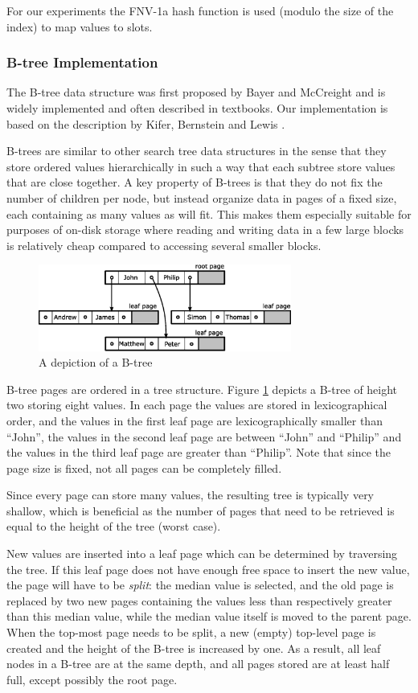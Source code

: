 \documentclass{acm_proc_article-sp}
\begin{document}
For our
experiments the FNV-1a hash function \cite{noll2004fnv} is used (modulo the
size of the index) to map values to slots.

\subsubsection{B-tree Implementation}
The B-tree data structure was first proposed by Bayer and McCreight
\cite{bayer1970oam} and is widely implemented and often described in
textbooks. Our implementation is based on the description by Kifer, Bernstein
and Lewis \cite{kifer2006dsa}.

B-trees are similar to other search tree data structures in the sense that
they store ordered values hierarchically in such a way that each subtree store
values that are close together.
A key property of B-trees is that they do not fix the number of children per
node, but instead organize data in pages of a fixed size, each containing
as many values as will fit. This makes them especially suitable for purposes
of on-disk storage where reading and writing data in a few large blocks is
relatively cheap compared to accessing several smaller blocks.

\begin{figure}
\centering
\includegraphics[width=83mm]{b-tree}
\caption{A depiction of a B-tree}
\label{fig-b-tree}
\end{figure}

B-tree pages are ordered in a tree structure. Figure \ref{fig-b-tree} depicts a
B-tree of height two storing eight values.
In each page the values are stored in lexicographical order, and the values
in the first leaf page are lexicographically smaller than ``John'', the values
in the second leaf page are between ``John'' and ``Philip'' and the values in
the third leaf page are greater than ``Philip''. Note that since the page
size is fixed, not all pages can be completely filled.

Since every page can store many values, the resulting tree is typically very
shallow, which is beneficial as the number of pages that need to be retrieved
is equal to the height of the tree (worst case).

New values are inserted into a leaf page which can be determined by traversing
the tree.
If this leaf page does not have enough free space to insert the new value,
the page will have to be \emph{split}: the median value is selected, and the old
page is replaced by two new pages containing the values less than respectively
greater than this median value, while the median value itself is moved to the
parent page.
When the top-most page needs to be split, a new (empty) top-level page is
created and the height of the B-tree is increased by one. As a result, all leaf
nodes in a B-tree are at the same depth, and all pages stored are at least half
full, except possibly the root page.
\end{document}
